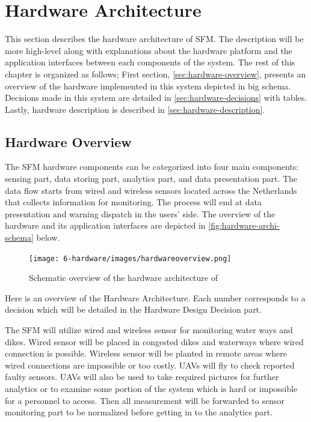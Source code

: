 \chapter{Hardware Architecture}
\label{ch:hardware}
This section describes the hardware architecture of SFM. The description will be more high-level along with explanations about the hardware platform and the application interfaces between each components of the system. The rest of this chapter is organized as follows; First section, \autoref{sec:hardware-overview}, presents an overview of the hardware implemented in this system depicted in big schema. Decisions made in this system are detailed in \autoref{sec:hardware-decisions} with tables. Lastly, hardware description is described in \autoref{sec:hardware-description}.

\section{Hardware Overview}
\label{sec:hardware-overview}
The SFM hardware components can be categorized into four main components: sensing part, data storing part, analytics part, and data presentation part. The data flow starts from wired and wireless sensors located across the Netherlands that collects information for monitoring. The process will end at data presentation and warning dispatch in the users' side. The overview of the hardware and its application interfaces are depicted in \autoref{fig:hardware-archi-schema} below.

\begin{figure}[hb!]
\centering
\texttt{[image: 6-hardware/images/hardwareoverview.png]}
\caption{Schematic overview of the hardware architecture of \ProjectName{}}
\label{fig:hardware-archi-schema}
\end{figure}

Here is an overview of the Hardware Architecture. Each number corresponds to a decision which will be detailed in the Hardware Design Decision part.

The SFM will utilize wired and wireless sensor for monitoring water ways and dikes. Wired sensor will be placed in congested dikes and waterways where wired connection is possible. Wireless sensor will be planted in remote areas where wired connections are impossible or too costly. UAVs will fly to check reported faulty sensors. UAVs will also be used to take required pictures for further analytics or to examine some portion of the system which is hard or impossible for a personnel to access. Then all measurement will be forwarded to sensor monitoring part to be normalized before getting in to the analytics part.

